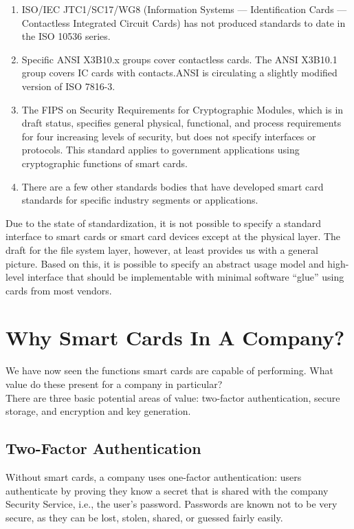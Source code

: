 \begin{enumerate}
  \item ISO/IEC JTC1/SC17/WG8 (Information Systems --- Identification Cards
--- Contactless Integrated Circuit Cards) has not produced standards to
date in the ISO 10536 series.

  \item Specific ANSI X3B10.x groups cover contactless cards. The ANSI
X3B10.1 group covers IC cards with contacts.ANSI is circulating a
slightly modified version of ISO 7816-3.

  \item The FIPS on Security Requirements for Cryptographic Modules, which
is in draft status, specifies general physical, functional, and process
requirements for four increasing levels of security, but does not
specify interfaces or protocols. This standard applies to government
applications using cryptographic functions of smart cards.

  \item There are a few other standards bodies that have developed smart
card standards for specific industry segments or applications.
\end{enumerate}

Due to the state of standardization, it is not possible to specify a
standard interface to smart cards or smart card devices except at the
physical layer. The draft for the file system layer, however, at least
provides us with a general picture. Based on this, it is possible to
specify an abstract usage model and high-level interface that should be
implementable with minimal software ``glue'' using cards from most
vendors.


\section{Why Smart Cards In A Company?}

We have now seen the functions smart cards are capable of performing.
What value do these present for a company in particular?\\

There are three basic potential areas of value: two-factor
authentication, secure storage, and encryption and key generation.

\subsection{Two-Factor Authentication}

Without smart cards, a company uses one-factor authentication: users
authenticate by proving they know a secret that is shared with the
company Security Service, i.e., the user's password. Passwords are
known not to be very secure, as they can be lost, stolen, shared, or
guessed fairly easily.\\


